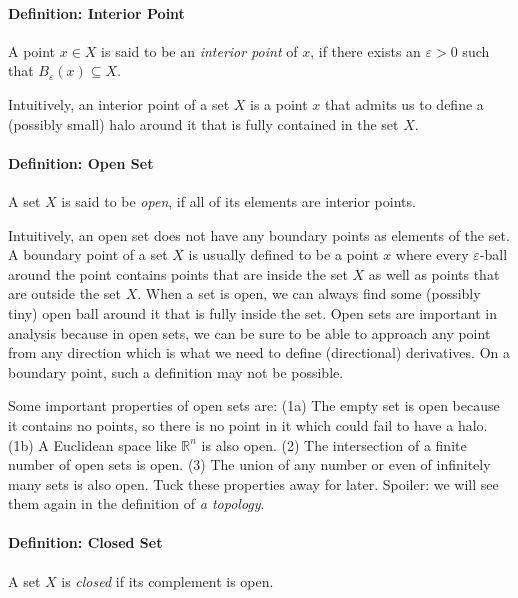 \paragraph{Definition: Interior Point} A point $x \in X$ is said to be an \emph{interior point} of $x$, if there exists an $\varepsilon > 0$ such that $B_\varepsilon(x) \subseteq X$. 


\medskip
Intuitively, an interior point of a set $X$ is a point $x$ that admits us to define a (possibly small) halo around it that is fully contained in the set $X$.

\paragraph{Definition: Open Set} A set $X$ is said to be \emph{open}, if all of its elements are interior points. 

\medskip
Intuitively, an open set does not have any boundary points as elements of the set. A boundary point of a set $X$ is usually defined to be a point $x$ where every $\varepsilon$-ball around the point contains points that are inside the set $X$ as well as points that are outside the set $X$. When a set is open, we can always find some (possibly tiny) open ball around it that is fully inside the set. Open sets are important in analysis because in open sets, we can be sure to be able to approach any point from any direction which is what we need to define (directional) derivatives. On a boundary point, such a definition may not be possible.

\medskip
Some important properties of open sets are: (1a) The empty set is open because it contains no points, so there is no point in it which could fail to have a halo. (1b) A Euclidean space like $\mathbb{R}^n$ is also open. (2) The intersection of a finite number of open sets is open. (3) The union of any number or even of infinitely many sets is also open. Tuck these properties away for later. Spoiler: we will see them again in the definition of \emph{a topology}.


\paragraph{Definition: Closed Set} A set $X$ is \emph{closed} if its complement is open.

